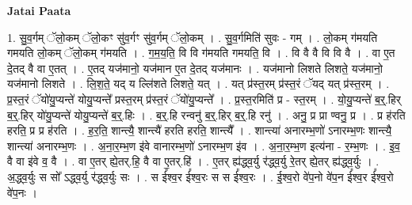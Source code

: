 \documentclass[17pt]{extarticle}
\begin{document}
\textbf{Jatai Paata} \newline

1. सु॒व॒र्गम् ॅलो॒कम् ॅलो॒कꣳ सु॑व॒र्गꣳ सु॑व॒र्गम् ॅलो॒कम् । . सु॒व॒र्गमिति॑ सुवः - गम् । . लो॒कम् ग॑मयति गमयति लो॒कम् ॅलो॒कम् ग॑मयति । . ग॒म॒य॒ति॒ वि वि ग॑मयति गमयति॒ वि । . वि वै वै वि वि वै । . वा ए॒त दे॒तद् वै वा ए॒तत् । . ए॒तद् यज॑मानो॒ यज॑मान ए॒त दे॒तद् यज॑मानः । . यज॑मानो लिशते लिशते॒ यज॑मानो॒ यज॑मानो लिशते । . लि॒श॒ते॒ यद् य ल्लि॑शते लिशते॒ यत् । . यत् प्र॑स्त॒रम् प्र॑स्त॒रं ॅयद् यत् प्र॑स्त॒रम् । . प्र॒स्त॒रं ॅयो॑यु॒प्यन्ते॑ योयु॒प्यन्ते᳚ प्रस्त॒रम् प्र॑स्त॒रं ॅयो॑यु॒प्यन्ते᳚ । . प्र॒स्त॒रमिति॑ प्र - स्त॒रम् । . यो॒यु॒प्यन्ते॑ ब॒र्॒.हिर् ब॒र्॒.हिर् यो॑यु॒प्यन्ते॑ योयु॒प्यन्ते॑ ब॒र्॒.हिः । . ब॒र्॒.हि रन्वनु॑ ब॒र्॒.हिर् ब॒र्॒.हि रनु॑ । . अनु॒ प्र प्रा ण्वनु॒ प्र । . प्र ह॑रति हरति॒ प्र प्र ह॑रति । . ह॒र॒ति॒ शान्त्यै॒ शान्त्यै॑ हरति हरति॒ शान्त्यै᳚ । . शान्त्या॑ अनारम्भ॒णो॑ ऽनारम्भ॒णः शान्त्यै॒ शान्त्या॑ अनारम्भ॒णः । . अ॒ना॒र॒म्भ॒ण इ॑वे वानारम्भ॒णो॑ ऽनारम्भ॒ण इ॑व । . अ॒ना॒र॒म्भ॒ण इत्य॑ना - र॒म्भ॒णः । . इ॒व॒ वै वा इ॑वे व॒ वै । . वा ए॒तर् ह्ये॒तर्.हि॒ वै वा ए॒तर्.हि॑ । . ए॒तर् ह्य॑द्ध्व॒र्यु र॑द्ध्व॒र्यु रे॒तर् ह्ये॒तर् ह्य॑द्ध्व॒र्युः । . अ॒द्ध्व॒र्युः स सो᳚ ऽद्ध्व॒र्यु र॑द्ध्व॒र्युः सः । . स ई᳚श्व॒र ई᳚श्व॒रः स स ई᳚श्व॒रः । . ई॒श्व॒रो वे॑प॒नो वे॑प॒न ई᳚श्व॒र ई᳚श्व॒रो वे॑प॒नः । \newline
\end{document}
